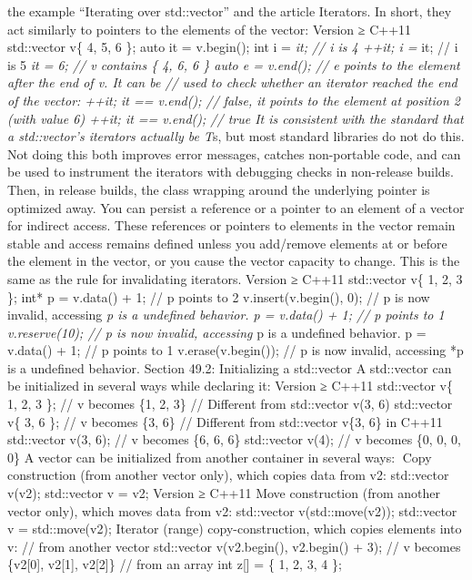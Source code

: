 the example ``Iterating over std::vector'' and the article Iterators. In
short, they act similarly to pointers to the elements of the vector:
Version ≥ C++11 std::vector v\{ 4, 5, 6 \}; auto it = v.begin(); int i =
\emph{it; // i is 4 ++it; i = }it; // i is 5 \emph{it = 6; // v contains
\{ 4, 6, 6 \} auto e = v.end(); // e points to the element after the end
of v. It can be // used to check whether an iterator reached the end of
the vector: ++it; it == v.end(); // false, it points to the element at
position 2 (with value 6) ++it; it == v.end(); // true It is consistent
with the standard that a std::vector's iterators actually be T}s, but
most standard libraries do not do this. Not doing this both improves
error messages, catches non-portable code, and can be used to instrument
the iterators with debugging checks in non-release builds. Then, in
release builds, the class wrapping around the underlying pointer is
optimized away. You can persist a reference or a pointer to an element
of a vector for indirect access. These references or pointers to
elements in the vector remain stable and access remains deﬁned unless
you add/remove elements at or before the element in the vector, or you
cause the vector capacity to change. This is the same as the rule for
invalidating iterators. Version ≥ C++11 std::vector v\{ 1, 2, 3 \}; int*
p = v.data() + 1; // p points to 2 v.insert(v.begin(), 0); // p is now
invalid, accessing \emph{p is a undefined behavior. p = v.data() + 1; //
p points to 1 v.reserve(10); // p is now invalid, accessing }p is a
undefined behavior. p = v.data() + 1; // p points to 1
v.erase(v.begin()); // p is now invalid, accessing *p is a undefined
behavior. Section 49.2: Initializing a std::vector A std::vector can be
initialized in several ways while declaring it: Version ≥ C++11
std::vector v\{ 1, 2, 3 \}; // v becomes \{1, 2, 3\} // Different from
std::vector v(3, 6) std::vector v\{ 3, 6 \}; // v becomes \{3, 6\} //
Different from std::vector v\{3, 6\} in C++11 std::vector v(3, 6); // v
becomes \{6, 6, 6\} std::vector v(4); // v becomes \{0, 0, 0, 0\} A
vector can be initialized from another container in several ways: Copy
construction (from another vector only), which copies data from v2:
std::vector v(v2); std::vector v = v2; Version ≥ C++11 Move construction
(from another vector only), which moves data from v2: std::vector
v(std::move(v2)); std::vector v = std::move(v2); Iterator (range)
copy-construction, which copies elements into v: // from another vector
std::vector v(v2.begin(), v2.begin() + 3); // v becomes \{v2{[}0{]},
v2{[}1{]}, v2{[}2{]}\} // from an array int z{[}{]} = \{ 1, 2, 3, 4 \};
